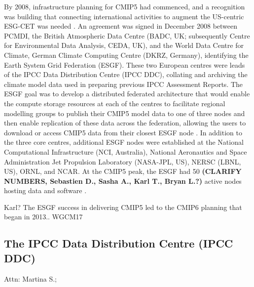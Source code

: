 \documentclass[gmd, preprint]{copernicus}
\newcommand{\mycomment}[1]{}
\def\cred#1{{\color{red}#1}}
\begin{document}
By 2008, infrastructure planning for CMIP5 had commenced, and a recognition was building that connecting international activities to augment the US-centric ESG-CET was needed \citep{williams_global_2016}. An agreement was signed in December 2008 between PCMDI, the British Atmospheric Data Centre (BADC, UK; subsequently Centre for Environmental Data Analysis, CEDA, UK), and the World Data Centre for Climate, German Climate Computing Centre (DKRZ, Germany), identifying the Earth System Grid Federation (ESGF). These two European centres were leads of the IPCC Data Distribution Centre (IPCC DDC), collating and archiving the climate model data used in preparing previous IPCC Assessment Reports. The ESGF goal was to develop a distributed federated architecture that would enable the compute storage resources at each of the centres to facilitate regional modelling groups to publish their CMIP5 model data to one of three nodes and then enable replication of these data across the federation, allowing the users to download or access CMIP5 data from their closest ESGF node \citep{williams_earth_2011}. In addition to the three core centres, additional ESGF nodes were established at the National Computational Infrastructure (NCI, Australia), National Aeronautics and Space Administration Jet Propulsion Laboratory (NASA-JPL, US), NERSC (LBNL, US), ORNL, and NCAR. At the CMIP5 peak, the ESGF had 50 \cred{\textbf{(CLARIFY NUMBERS, Sebastien D., Sasha A., Karl T., Bryan L.?)}} active nodes hosting data and software \citep{williams_global_2016}.
\mycomment{
CMIP6 current nodes - https://aims2.llnl.gov/nodes
Very early CMIP5 http://web.archive.org/web/20111015000202/http://pcmdi3.llnl.gov/esgcet/home.htm 7 nodes ESG-CET + BADC, WDCC, NCI
ESG-CET NCAR, LLNL, ORNL https://extranet.gfdl.noaa.gov/~vb/curator/AR5-20071017/ESG-CET200710.pdf Oct 2007
2013 Aspen workshop - https://www.wcrp-climate.org/images/modelling/WGCM/WGCM17/WGCM17_report.pdf;
Middleton, Foster and Williams et al., 2006: Earth System Grid II final report 2001-2006 SCIDAC https://www.osti.gov/servlets/purl/1113798 https://doi.org/10.2172/1113798
}
\cred{Karl? The ESGF success in delivering CMIP5 led to the CMIP6 planning that began in 2013.. WGCM17}


\subsection{The IPCC Data Distribution Centre (IPCC DDC)}
\label{sec:IPCC-DDC}
\cred{Attn: Martina S.; \citep{stockhause_quality_2012,stockhause_cmip6_2017,stockhause_twenty-five_2022}}
\end{document}
